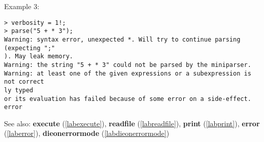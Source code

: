\noindent Example 3: 
\begin{center}\begin{minipage}{15cm}\begin{Verbatim}[frame=single]
> verbosity = 1!;
> parse("5 + * 3");
Warning: syntax error, unexpected *. Will try to continue parsing (expecting ";"
). May leak memory.
Warning: the string "5 + * 3" could not be parsed by the miniparser.
Warning: at least one of the given expressions or a subexpression is not correct
ly typed
or its evaluation has failed because of some error on a side-effect.
error
\end{Verbatim}
\end{minipage}\end{center}
See also: \textbf{execute} (\ref{labexecute}), \textbf{readfile} (\ref{labreadfile}), \textbf{print} (\ref{labprint}), \textbf{error} (\ref{laberror}), \textbf{dieonerrormode} (\ref{labdieonerrormode})
